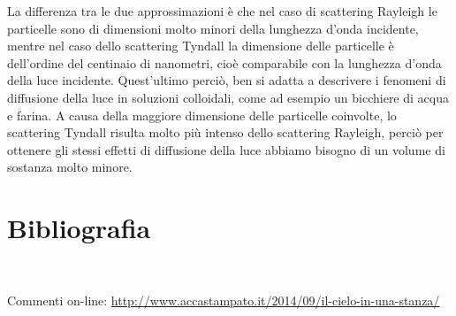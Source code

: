 La differenza tra le due approssimazioni è che nel caso di scattering Rayleigh le particelle sono di dimensioni molto minori della lunghezza d'onda incidente, mentre nel caso dello scattering Tyndall la dimensione delle particelle è dell'ordine del centinaio di nanometri, cioè comparabile con la lunghezza d'onda della luce incidente. Quest'ultimo perciò, ben si adatta a descrivere i fenomeni di diffusione della luce in soluzioni colloidali, come ad esempio un bicchiere di acqua e farina.
A causa della maggiore dimensione delle particelle coinvolte, lo scattering Tyndall risulta molto più intenso dello scattering Rayleigh, perciò per ottenere gli stessi effetti di diffusione della luce abbiamo bisogno di un volume di sostanza molto minore.

\balance
\section*{Bibliografia}
\\

\smallskip
Commenti on-line: \url{http://www.accastampato.it/2014/09/il-cielo-in-una-stanza/}
